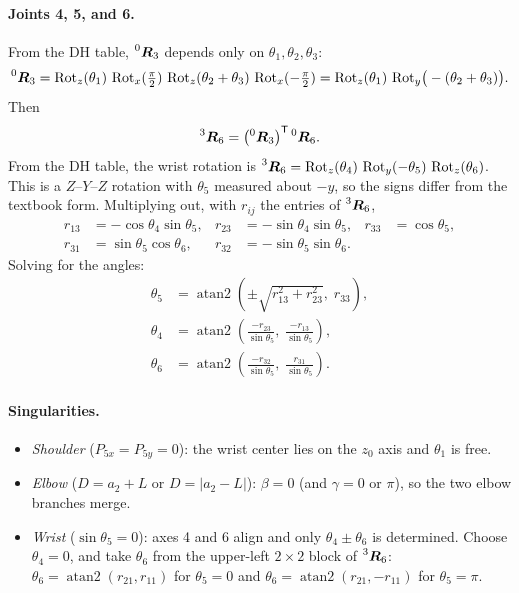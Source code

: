\documentclass[11pt]{article}
\newcommand{\R}{\bm{R}}
\newcommand{\Rotx}{\operatorname{Rot}_x}
\newcommand{\Roty}{\operatorname{Rot}_y}
\newcommand{\Rotz}{\operatorname{Rot}_z}
\newcommand{\atantwo}{\operatorname{atan2}}
\begin{document}
\paragraph{Joints 4, 5, and 6.} From the DH table, $\prescript{0}{}{\R}_3$ depends only on $\theta_1,\theta_2,\theta_3$:
\begin{equation}
\prescript{0}{}{\R}_3 = \Rotz(\theta_1)\,\Rotx(\tfrac{\pi}{2})\,\Rotz(\theta_2+\theta_3)\,\Rotx(-\tfrac{\pi}{2}) = \Rotz(\theta_1)\,\Roty\!\big(-(\theta_2+\theta_3)\big).
\end{equation}
Then
\begin{equation}
\prescript{3}{}{\R}_6 = \left(\prescript{0}{}{\R}_3\right)^{\mathsf T}\prescript{0}{}{\R}_6 .
\end{equation}
From the DH table, the wrist rotation is $\prescript{3}{}{\R}_6 = \Rotz(\theta_4)\,\Roty(-\theta_5)\,\Rotz(\theta_6)$. This is a $Z$--$Y$--$Z$ rotation with $\theta_5$ measured about $-y$, so the signs differ from the textbook form. Multiplying out, with $r_{ij}$ the entries of $\prescript{3}{}{\R}_6$,
\begin{align}
r_{13} &= -\cos\theta_4\sin\theta_5, & r_{23} &= -\sin\theta_4\sin\theta_5, & r_{33} &= \cos\theta_5, \\
r_{31} &= \sin\theta_5\cos\theta_6, & r_{32} &= -\sin\theta_5\sin\theta_6 . & &
\end{align}
Solving for the angles:
\begin{align}
\theta_5 &= \atantwo\!\left(\pm\sqrt{r_{13}^2+r_{23}^2},\; r_{33}\right), \\
\theta_4 &= \atantwo\!\left(\frac{-r_{23}}{\sin\theta_5},\; \frac{-r_{13}}{\sin\theta_5}\right), \\
\theta_6 &= \atantwo\!\left(\frac{-r_{32}}{\sin\theta_5},\; \frac{r_{31}}{\sin\theta_5}\right).
\end{align}

\paragraph{Singularities.}
\begin{itemize}[leftmargin=1.6em, itemsep=1pt]
    \item \emph{Shoulder} ($P_{5x}=P_{5y}=0$): the wrist center lies on the $z_0$ axis and $\theta_1$ is free.
    \item \emph{Elbow} ($D=a_2+L$ or $D=|a_2-L|$): $\beta=0$ (and $\gamma=0$ or $\pi$), so the two elbow branches merge.
    \item \emph{Wrist} ($\sin\theta_5=0$): axes 4 and 6 align and only $\theta_4\pm\theta_6$ is determined. Choose $\theta_4=0$, and take $\theta_6$ from the upper-left $2\times2$ block of $\prescript{3}{}{\R}_6$: $\theta_6=\atantwo(r_{21},r_{11})$ for $\theta_5=0$ and $\theta_6=\atantwo(r_{21},-r_{11})$ for $\theta_5=\pi$.
\end{itemize}
\end{document}
